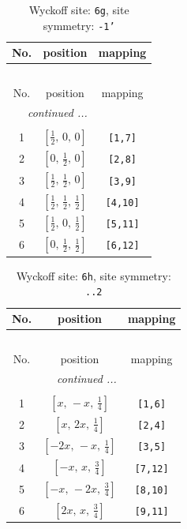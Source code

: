 \documentclass[fleqn,8pt]{jsarticle}
\begin{document}
\renewcommand{\arraystretch}{1.2}
\begin{longtable}{ccc}
\caption{Wyckoff site: {\tt 6g}, site symmetry: {\tt -1'}}
 \\
 \hline \hline
No. & position & mapping \\ \hline \endfirsthead

\multicolumn{2}{l}{\tablename\ \thetable{}} \\
 \hline \hline
No. & position & mapping \\ \hline \endhead

 \hline \hline
\multicolumn{2}{r}{\footnotesize\it continued ...} \\ \endfoot

 \hline \hline
\multicolumn{2}{r}{} \\ \endlastfoot

1 & $\left[ \frac{1}{2},\, 0,\, 0 \right]$ & {\tt [1,7]} \\ \hline
2 & $\left[ 0,\, \frac{1}{2},\, 0 \right]$ & {\tt [2,8]} \\ \hline
3 & $\left[ \frac{1}{2},\, \frac{1}{2},\, 0 \right]$ & {\tt [3,9]} \\ \hline
4 & $\left[ \frac{1}{2},\, \frac{1}{2},\, \frac{1}{2} \right]$ & {\tt [4,10]} \\ \hline
5 & $\left[ \frac{1}{2},\, 0,\, \frac{1}{2} \right]$ & {\tt [5,11]} \\ \hline
6 & $\left[ 0,\, \frac{1}{2},\, \frac{1}{2} \right]$ & {\tt [6,12]} \\
\end{longtable}
\renewcommand{\arraystretch}{1.2}
\begin{longtable}{ccc}
\caption{Wyckoff site: {\tt 6h}, site symmetry: {\tt ..2}}
 \\
 \hline \hline
No. & position & mapping \\ \hline \endfirsthead

\multicolumn{2}{l}{\tablename\ \thetable{}} \\
 \hline \hline
No. & position & mapping \\ \hline \endhead

 \hline \hline
\multicolumn{2}{r}{\footnotesize\it continued ...} \\ \endfoot

 \hline \hline
\multicolumn{2}{r}{} \\ \endlastfoot

1 & $\left[ x,\, - x,\, \frac{1}{4} \right]$ & {\tt [1,6]} \\ \hline
2 & $\left[ x,\, 2 x,\, \frac{1}{4} \right]$ & {\tt [2,4]} \\ \hline
3 & $\left[ - 2 x,\, - x,\, \frac{1}{4} \right]$ & {\tt [3,5]} \\ \hline
4 & $\left[ - x,\, x,\, \frac{3}{4} \right]$ & {\tt [7,12]} \\ \hline
5 & $\left[ - x,\, - 2 x,\, \frac{3}{4} \right]$ & {\tt [8,10]} \\ \hline
6 & $\left[ 2 x,\, x,\, \frac{3}{4} \right]$ & {\tt [9,11]} \\
\end{longtable}
\end{document}
